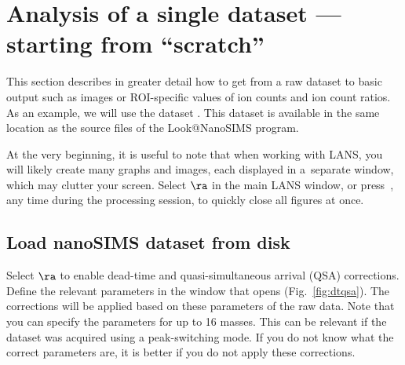 \section{Analysis of a single dataset --- starting from ``scratch''}
\label{sec:level1}

This section describes in greater detail how to get from a raw dataset to basic output such as images or ROI-specific values of ion counts and ion count ratios. As an example, we will use the dataset . This dataset is available in the same location as the source files of the Look@NanoSIMS program.

\nb
At the very beginning, it is useful to note that when working with LANS, you will likely create many graphs and images, each displayed in a~separate window, which may clutter your screen. Select  $\ra$  in the main LANS window, or press~, any time during the processing session, to quickly close all figures at once.


\subsection{Load nanoSIMS dataset from disk}
\setcounter{step}{0}

\s Select  $\ra$  to enable dead-time and quasi-simul\-ta\-neous arrival (QSA) corrections. Define the relevant parameters in the window that opens (Fig.~\ref{fig:dtqsa}). The corrections will be applied based on these parameters  of the raw data. Note that you can specify the parameters for up to 16 masses. This can be relevant if the dataset was acquired using a peak-switching mode. If you do not know what the correct parameters are, it is better if you do not apply these corrections.

